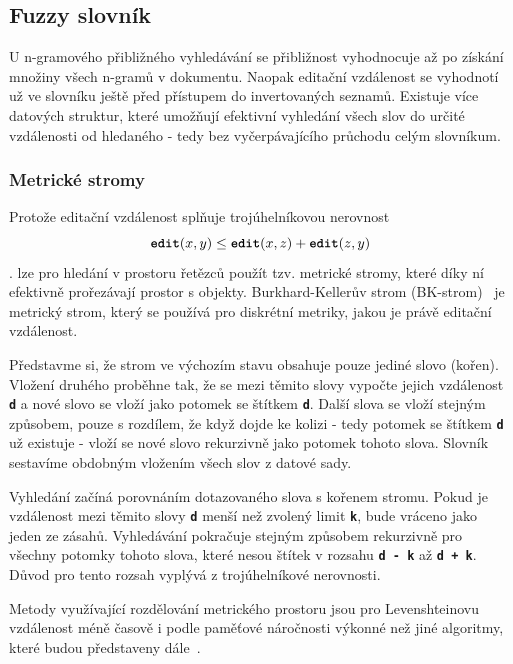 \documentclass[11pt,letterpaper,oneside,openright]{book}
\newcommand{\bftt}[1]{\texttt{\textbf{#1}}}
\begin{document}
\subsection{Fuzzy slovník}
U n-gramového přibližného vyhledávání se přibližnost vyhodnocuje až po získání
množiny všech n-gramů v dokumentu. Naopak editační vzdálenost se vyhodnotí už ve
slovníku ještě před přístupem do invertovaných seznamů. Existuje více datových
struktur, které umožňují efektivní vyhledání všech slov do určité vzdálenosti
od hledaného - tedy bez vyčerpávajícího průchodu celým slovníkum.

\subsubsection{Metrické stromy}
Protože editační vzdálenost splňuje trojúhelníkovou nerovnost
\[\bftt{edit}(x,y) \leq \bftt{edit}(x,z) + \bftt{edit}(z,y)\]. lze pro hledání
v prostoru řetězců použít tzv. metrické stromy, které díky ní efektivně
prořezávají prostor s objekty. Burkhard-Kellerův strom
(BK-strom)~\cite{Burkhard:1973:ABF:362003.362025} je metrický strom, který se
používá pro diskrétní metriky, jakou je právě editační vzdálenost.

Představme si, že strom ve výchozím stavu obsahuje pouze jediné slovo (kořen).
Vložení druhého proběhne tak, že se mezi těmito slovy vypočte jejich vzdálenost
\bftt{d} a nové slovo se vloží jako potomek se štítkem \bftt{d}. Další slova se
vloží stejným způsobem, pouze s rozdílem, že když dojde ke kolizi - tedy
potomek se štítkem \bftt{d} už existuje - vloží se nové slovo rekurzivně jako
potomek tohoto slova. Slovník sestavíme obdobným vložením všech slov z datové sady.

Vyhledání začíná porovnáním dotazovaného slova s kořenem stromu. Pokud je
vzdálenost mezi těmito slovy \bftt{d} menší než zvolený limit \bftt{k}, bude
vráceno jako jeden ze zásahů. Vyhledávání pokračuje stejným způsobem rekurzivně
pro všechny potomky tohoto slova, které nesou štítek v rozsahu \bftt{d - k} až
\bftt{d + k}. Důvod pro tento rozsah vyplývá z trojúhelníkové nerovnosti.

Metody využívající rozdělování metrického prostoru jsou pro Levenshteinovu
vzdálenost méně časově i podle paměťové náročnosti výkonné než jiné algoritmy,
které budou představeny
dále~\cite{Celikik:2009:FES:1529282.1529669,Boytsov:2011:IMA:1963190.1963191}.
\end{document}
